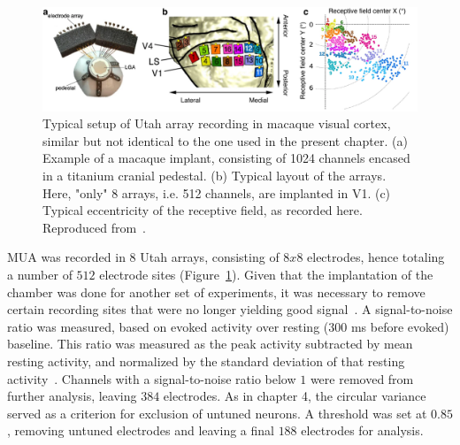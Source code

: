 \begin{figure}[h!tbp]
\vspace{0.1cm}
\centering
\includegraphics[width=1.\textwidth]{fig/chap5_1024chans.pdf}
\caption[Utah array recording in macaques.]{Typical setup of Utah array recording in macaque visual cortex, similar but not identical to the one used in the present chapter. (a) Example of a macaque implant, consisting of 1024 channels encased in a titanium cranial pedestal. (b) Typical layout of the arrays. Here, "only" 8 arrays, i.e. 512 channels, are implanted in \gls{V1}. (c) Typical eccentricity of the receptive field, as recorded here. Reproduced from~\cite{chen20221024}.}
\label{fig_chap5_1024chans} 
\end{figure} 

\gls{MUA} was recorded in $8$ Utah arrays, consisting of $8x8$ electrodes, hence totaling a number of $512$ electrode sites (Figure~\ref{fig_chap5_1024chans}). Given that the implantation of the chamber was done for another set of experiments, it was necessary to remove certain recording sites that were no longer yielding good signal~\cite{super2005chronic}. A signal-to-noise ratio was measured, based on evoked activity over resting ($300$ ms before evoked) baseline. This ratio was measured as the peak activity subtracted by mean resting activity, and normalized by the standard deviation of that resting activity~\cite{chen20221024}. Channels with a signal-to-noise ratio below $1$ were removed from further analysis, leaving $384$ electrodes. As in chapter 4, the circular variance served as a criterion for exclusion of untuned neurons. A threshold was set at $0.85$, removing untuned electrodes and leaving a final $188$ electrodes for analysis.

